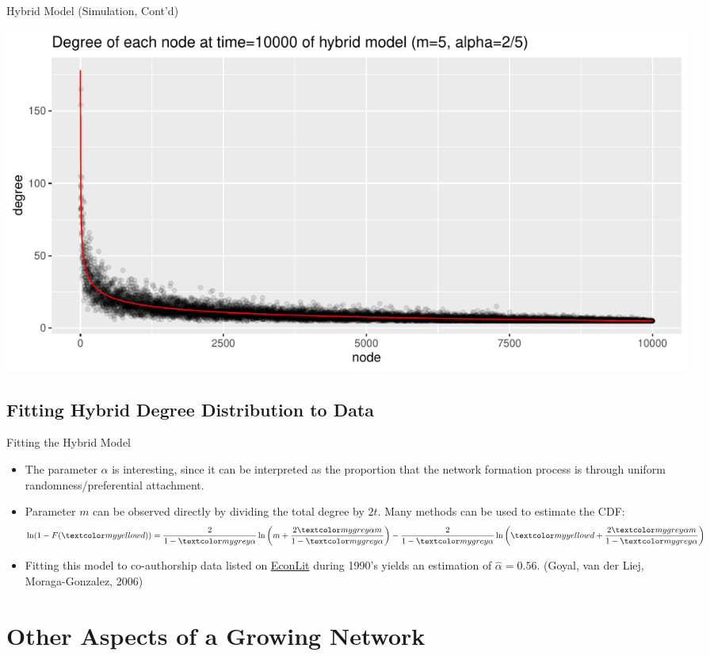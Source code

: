 \documentclass{beamer}
\begin{document}
\begin{frame}{Hybrid Model (Simulation, Cont'd)}
	\begin{center}
		\includegraphics[width=\textwidth]{figures-R/hybrid-degree.pdf}
	\end{center}
\end{frame}

\subsection*{Fitting Hybrid Degree Distribution to Data}

\begin{frame}{Fitting the Hybrid Model}
	\begin{itemize}
		\item
			The parameter $\alpha$ is interesting,
			since it can be interpreted as the proportion that the network formation process is through uniform randomness/preferential attachment.
		\item
			Parameter $m$ can be observed directly by dividing the total degree by $2t$.
			Many methods can be used to estimate the CDF:
			\begin{align*}
				\ln(1-F(\yellow{d}))
				= \frac{2}{1-\grey{\alpha}}\ln\left(m+\frac{2\grey{\alpha} m}{1-\grey{\alpha}}\right)
				- \frac{2}{1-\grey{\alpha}}\ln\left(\yellow{d}+\frac{2\grey{\alpha} m}{1-\grey{\alpha}}\right)
			\end{align*}
		\item
			Fitting this model to co-authorship data listed on \href{https://www.aeaweb.org/econlit/}{EconLit} during 1990's yields an estimation of $\hat\alpha=0.56$.
			(Goyal, van der Liej, Moraga-Gonzalez, 2006)
	\end{itemize}
\end{frame}

\section{Other Aspects of a Growing Network}
\end{document}

